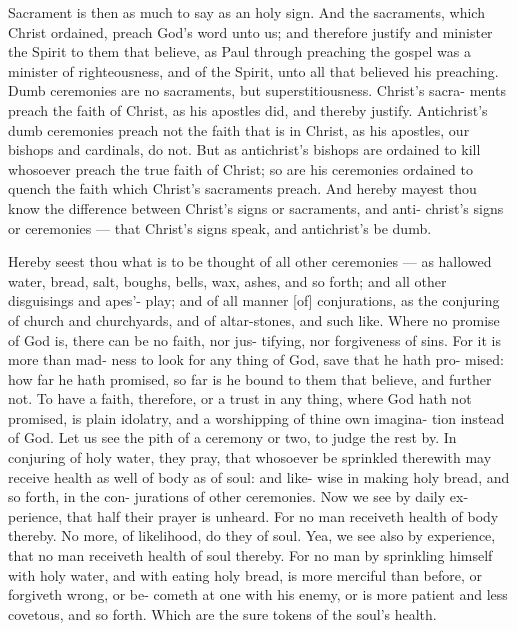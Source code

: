 \documentclass{custom}
\begin{document}
Sacrament is then as much to say as an holy sign. 
And the sacraments, which Christ ordained, preach God's 
word unto us; and therefore justify and minister the 
Spirit to them that believe, as Paul through preaching the 
gospel was a minister of righteousness, and of the Spirit, 
unto all that believed his preaching. Dumb ceremonies 
are no sacraments, but superstitiousness. Christ's sacra- 
ments preach the faith of Christ, as his apostles did, and 
thereby justify. Antichrist's dumb ceremonies preach not 
the faith that is in Christ, as his apostles, our bishops and 
cardinals, do not. But as antichrist's bishops are ordained 
to kill whosoever preach the true faith of Christ; so are 
his ceremonies ordained to quench the faith which Christ's 
sacraments preach. And hereby mayest thou know the
difference between Christ's signs or sacraments, and anti-
christ's signs or ceremonies — that Christ's signs speak, and
antichrist's be dumb.

Hereby seest thou what is to be thought of all other 
ceremonies — as hallowed water, bread, salt, boughs, bells, 
wax, ashes, and so forth; and all other disguisings and apes'- 
play; and of all manner [of] conjurations, as the conjuring 
of church and churchyards, and of altar-stones, and such like. 
Where no promise of God is, there can be no faith, nor jus- 
tifying, nor forgiveness of sins. For it is more than mad- 
ness to look for any thing of God, save that he hath pro- 
mised: how far he hath promised, so far is he bound to them 
that believe, and further not. To have a faith, therefore,
or a trust in any thing, where God hath not promised, is
plain idolatry, and a worshipping of thine own imagina-
tion instead of God. Let us see the pith of a ceremony
or two, to judge the rest by. In conjuring of holy 
water, they pray, that whosoever be sprinkled therewith 
may receive health as well of body as of soul: and like- 
wise in making holy bread, and so forth, in the con- 
jurations of other ceremonies. Now we see by daily ex- 
perience, that half their prayer is unheard. For no man 
receiveth health of body thereby. No more, of likelihood, 
do they of soul. Yea, we see also by experience, that 
no man receiveth health of soul thereby. For no man by 
sprinkling himself with holy water, and with eating holy bread, 
is more merciful than before, or forgiveth wrong, or be- 
cometh at one with his enemy, or is more patient and less 
covetous, and so forth. Which are the sure tokens of the 
soul's health. 
\end{document}
